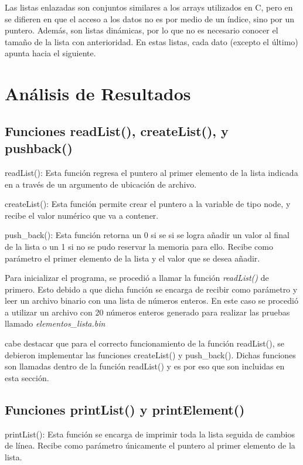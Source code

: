 \documentclass[12pt,a4paper]{article}
\begin{document}
Las listas enlazadas son conjuntos similares a los arrays utilizados en C, pero en se difieren en que el acceso a los datos no es por medio de un índice, sino por un puntero. Además, son listas dinámicas, por lo que no es necesario conocer el tamaño de la lista con anterioridad. En estas listas, cada dato (excepto el último) apunta hacia el siguiente. \cite{ccm} 

\vspace{25mm}

\section{Análisis de Resultados}

\subsection{Funciones readList(), createList(), y pushback()}

readList(): Esta función regresa el puntero al primer elemento de la lista indicada en a través de un argumento de ubicación de archivo. 

createList(): Esta función permite crear el puntero a la variable de tipo node, y recibe el valor numérico que va a contener. 

push\_back(): Esta función retorna un 0 si se si se logra añadir un valor al final de la lista o un 1 si no se pudo reservar la memoria para ello. Recibe como parámetro el primer elemento de la lista y el valor que se desea añadir.

Para inicializar el programa, se procedió a llamar la función \textit{readList()} de primero. Esto debido a que dicha función se encarga de recibir como parámetro y leer un archivo binario con una lista de números enteros. En este caso se procedió a utilizar un archivo con 20 números enteros generado para realizar las pruebas llamado \textit{elementos\_lista.bin}

cabe destacar que para el correcto funcionamiento de la función readList(), se debieron implementar las funciones createList() y push\_back(). Dichas funciones son llamadas dentro de la función readList() y es por eso que son incluidas en esta sección. 


\subsection{Funciones printList() y printElement()}

printList(): Esta función se encarga de imprimir toda la lista seguida de cambios de línea. Recibe como parámetro únicamente el puntero al primer elemento de la lista.
\end{document}
